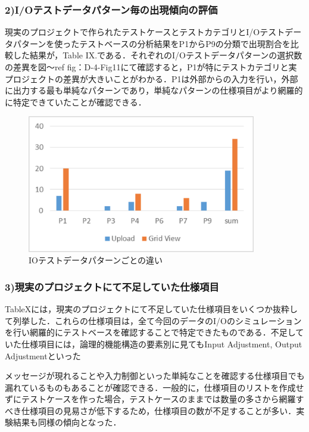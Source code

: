 \documentclass[a4paper,12pt]{jreport}
\begin{document}
\subsubsection{2)I/Oテストデータパターン毎の出現傾向の評価}

現実のプロジェクトで作られたテストケースとテストカテゴリとI/Oテストデータパターンを使ったテストベースの分析結果をP1からP9の分類で出現割合を比較した結果が，Table IX.である．それぞれのI/Oテストデータパターンの選択数の差異を図〜ref {fig：D-4-Fig11}にて確認すると，P1が特にテストカテゴリと実プロジェクトの差異が大きいことがわかる．P1は外部からの入力を行い，外部に出力する最も単純なパターンであり，単純なパターンの仕様項目がより網羅的に特定できていたことが確認できる．
   \begin{figure}[htbp]
  \begin{center}
  \includegraphics[width=10cm]{./image/D-4-Fig11.png}
  \caption{IOテストデータパターンごとの違い}
  \label{fig:D-4-Fig11}
  \end{center}
   \end{figure}


\subsubsection{3)現実のプロジェクトにて不足していた仕様項目}

TableXには，現実のプロジェクトにて不足していた仕様項目をいくつか抜粋して列挙した．これらの仕様項目は，全て今回のデータのI/Oのシミュレーションを行い網羅的にテストベースを確認することで特定できたものである．不足していた仕様項目には，論理的機能構造の要素別に見てもInput Adjustment, Output Adjustmentといった

メッセージが現れることや入力制御といった単純なことを確認する仕様項目でも漏れているものもあることが確認できる．一般的に，仕様項目のリストを作成せずにテストケースを作った場合，テストケースのままでは数量の多さから網羅すべき仕様項目の見易さが低下するため，仕様項目の数が不足することが多い．実験結果も同様の傾向となった．
\end{document}
